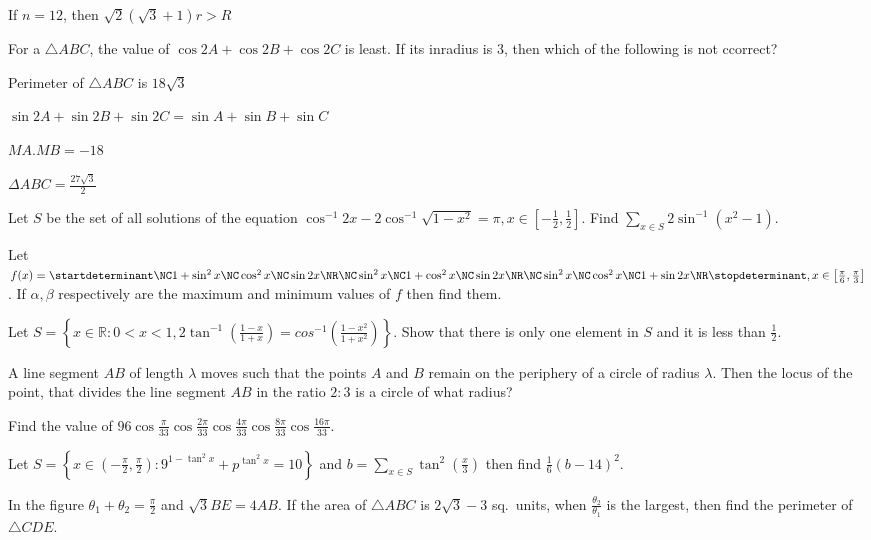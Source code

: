   \item If $n = 12$, then $\sqrt{2}\left(\sqrt{3} + 1\right)r > R$
  \stopitemize
\item For a $\triangle ABC$, the value of $\cos2A + \cos2B + \cos2C$ is least. If its inradius is $3$, then
  which of the following is not ccorrect?
  \startitemize[a, 1*broad]
  \item Perimeter of $\triangle ABC$ is $18\sqrt{3}$
  \item $\sin2A + \sin2B + \sin2C = \sin A + \sin B + \sin C$
  \item $MA.MB = -18$
  \item $\Delta ABC = \frac{27\sqrt{3}}{2}$
  \stopitemize
\item Let $S$ be the set of all solutions of the equation $\cos^{-1}2x - 2\cos^{-1}\sqrt{1 - x^2} = \pi,
  x\in\left[-\frac{1}{2}, \frac{1}{2}\right]$. Find $\displaystyle\sum_{x\in S}2\sin^{-1}\left(x^2 -
  1\right)$.
\item Let $f(x) = \startdeterminant\NC 1+ \sin^2x\NC \cos^2x\NC\sin2x\NR\NC \sin^2x\NC 1
  + \cos^2x\NC\sin2x \NR\NC \sin^2x\NC \cos^2x\NC 1 + \sin2x\NR\stopdeterminant,
  x\in\left[\frac{\pi}{6}, \frac{\pi}{3}\right]$. If $\alpha, \beta$ respectively are the maximum and
  minimum values of $f$ then find them.
\item Let $S = \left\{x\in\mathbb{R}: 0 < x < 1, 2\tan^{-1}\left(\frac{1 - x}{1 + x}\right)=
  cos^{-1}\left(\frac{1 - x^2}{1 + x^2}\right)\right\}$. Show that there is only one element in $S$ and it
  is less than $\frac{1}{2}$.
\item A line segment $AB$ of length $\lambda$ moves such that the points $A$ and $B$ remain on the periphery
  of a circle of radius $\lambda$. Then the locus of the point, that divides the line segment $AB$ in the
  ratio $2 : 3$ is a circle of what radius?
\item Find the value of
  $96\cos\frac{\pi}{33}\cos\frac{2\pi}{33}\cos\frac{4\pi}{33}\cos\frac{8\pi}{33}\cos\frac{16\pi}{33}$.
\item Let $S = \left\{x\in\left(-\frac{\pi}{2}, \frac{\pi}{2}\right): 9^{1 - \tan^2x} + p^{\tan^2x} =
  10\right\}$ and $b = \displaystyle\sum_{x\in S}\tan^2\left(\frac{x}{3}\right)$ then find $\frac{1}{6}(b -
  14)^2$.
\item In the figure $\theta_1 + \theta_2 = \frac{\pi}{2}$ and $\sqrt{3}BE = 4AB$. If the area of $\triangle
  ABC$ is $2\sqrt{3} - 3$ sq.\ units, when $\frac{\theta_2}{\theta_1}$ is the largest, then find the
  perimeter of $\triangle CDE$.

